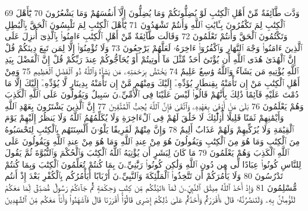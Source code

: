 {\tiny\colorbox{cl_aya}{69}} وَدَّت طَّآئِفَةٌ مِّنْ أَهْلِ ٱلْكِتَٰبِ لَوْ يُضِلُّونَكُمْ وَمَا يُضِلُّونَ إِلَّآ أَنفُسَهُمْ وَمَا يَشْعُرُونَ
{\tiny\colorbox{cl_aya}{70}} يَٰٓأَهْلَ ٱلْكِتَٰبِ لِمَ تَكْفُرُونَ بِـَٔايَٰتِ ٱللَّهِ وَأَنتُمْ تَشْهَدُونَ
{\tiny\colorbox{cl_aya}{71}} يَٰٓأَهْلَ ٱلْكِتَٰبِ لِمَ تَلْبِسُونَ ٱلْحَقَّ بِٱلْبَٰطِلِ وَتَكْتُمُونَ ٱلْحَقَّ وَأَنتُمْ تَعْلَمُونَ
{\tiny\colorbox{cl_aya}{72}} وَقَالَت طَّآئِفَةٌ مِّنْ أَهْلِ ٱلْكِتَٰبِ ءَامِنُوا۟ بِٱلَّذِىٓ أُنزِلَ عَلَى ٱلَّذِينَ ءَامَنُوا۟ وَجْهَ ٱلنَّهَارِ وَٱكْفُرُوٓا۟ ءَاخِرَهُۥ لَعَلَّهُمْ يَرْجِعُونَ
{\tiny\colorbox{cl_aya}{73}} وَلَا تُؤْمِنُوٓا۟ إِلَّا لِمَن تَبِعَ دِينَكُمْ قُلْ إِنَّ ٱلْهُدَىٰ هُدَى ٱللَّهِ أَن يُؤْتَىٰٓ أَحَدٌ مِّثْلَ مَآ أُوتِيتُمْ أَوْ يُحَآجُّوكُمْ عِندَ رَبِّكُمْ قُلْ إِنَّ ٱلْفَضْلَ بِيَدِ ٱللَّهِ يُؤْتِيهِ مَن يَشَآءُ وَٱللَّهُ وَٰسِعٌ عَلِيمٌ
{\tiny\colorbox{cl_aya}{74}} يَخْتَصُّ بِرَحْمَتِهِۦ مَن يَشَآءُ وَٱللَّهُ ذُو ٱلْفَضْلِ ٱلْعَظِيمِ
{\tiny\colorbox{cl_aya}{75}} وَمِنْ أَهْلِ ٱلْكِتَٰبِ مَنْ إِن تَأْمَنْهُ بِقِنطَارٍ يُؤَدِّهِۦٓ إِلَيْكَ وَمِنْهُم مَّنْ إِن تَأْمَنْهُ بِدِينَارٍ لَّا يُؤَدِّهِۦٓ إِلَيْكَ إِلَّا مَا دُمْتَ عَلَيْهِ قَآئِمًا ذَٰلِكَ بِأَنَّهُمْ قَالُوا۟ لَيْسَ عَلَيْنَا فِى ٱلْأُمِّيِّۦنَ سَبِيلٌ وَيَقُولُونَ عَلَى ٱللَّهِ ٱلْكَذِبَ وَهُمْ يَعْلَمُونَ
{\tiny\colorbox{cl_aya}{76}} بَلَىٰ مَنْ أَوْفَىٰ بِعَهْدِهِۦ وَٱتَّقَىٰ فَإِنَّ ٱللَّهَ يُحِبُّ ٱلْمُتَّقِينَ
{\tiny\colorbox{cl_aya}{77}} إِنَّ ٱلَّذِينَ يَشْتَرُونَ بِعَهْدِ ٱللَّهِ وَأَيْمَٰنِهِمْ ثَمَنًا قَلِيلًا أُو۟لَٰٓئِكَ لَا خَلَٰقَ لَهُمْ فِى ٱلْءَاخِرَةِ وَلَا يُكَلِّمُهُمُ ٱللَّهُ وَلَا يَنظُرُ إِلَيْهِمْ يَوْمَ ٱلْقِيَٰمَةِ وَلَا يُزَكِّيهِمْ وَلَهُمْ عَذَابٌ أَلِيمٌ
{\tiny\colorbox{cl_aya}{78}} وَإِنَّ مِنْهُمْ لَفَرِيقًا يَلْوُۥنَ أَلْسِنَتَهُم بِٱلْكِتَٰبِ لِتَحْسَبُوهُ مِنَ ٱلْكِتَٰبِ وَمَا هُوَ مِنَ ٱلْكِتَٰبِ وَيَقُولُونَ هُوَ مِنْ عِندِ ٱللَّهِ وَمَا هُوَ مِنْ عِندِ ٱللَّهِ وَيَقُولُونَ عَلَى ٱللَّهِ ٱلْكَذِبَ وَهُمْ يَعْلَمُونَ
{\tiny\colorbox{cl_aya}{79}} مَا كَانَ لِبَشَرٍ أَن يُؤْتِيَهُ ٱللَّهُ ٱلْكِتَٰبَ وَٱلْحُكْمَ وَٱلنُّبُوَّةَ ثُمَّ يَقُولَ لِلنَّاسِ كُونُوا۟ عِبَادًا لِّى مِن دُونِ ٱللَّهِ وَلَٰكِن كُونُوا۟ رَبَّٰنِيِّۦنَ بِمَا كُنتُمْ تُعَلِّمُونَ ٱلْكِتَٰبَ وَبِمَا كُنتُمْ تَدْرُسُونَ
{\tiny\colorbox{cl_aya}{80}} وَلَا يَأْمُرَكُمْ أَن تَتَّخِذُوا۟ ٱلْمَلَٰٓئِكَةَ وَٱلنَّبِيِّۦنَ أَرْبَابًا أَيَأْمُرُكُم بِٱلْكُفْرِ بَعْدَ إِذْ أَنتُم مُّسْلِمُونَ
{\tiny\colorbox{cl_aya}{81}} وَإِذْ أَخَذَ ٱللَّهُ مِيثَٰقَ ٱلنَّبِيِّۦنَ لَمَآ ءَاتَيْتُكُم مِّن كِتَٰبٍ وَحِكْمَةٍ ثُمَّ جَآءَكُمْ رَسُولٌ مُّصَدِّقٌ لِّمَا مَعَكُمْ لَتُؤْمِنُنَّ بِهِۦ وَلَتَنصُرُنَّهُۥ قَالَ ءَأَقْرَرْتُمْ وَأَخَذْتُمْ عَلَىٰ ذَٰلِكُمْ إِصْرِى قَالُوٓا۟ أَقْرَرْنَا قَالَ فَٱشْهَدُوا۟ وَأَنَا۠ مَعَكُم مِّنَ ٱلشَّٰهِدِينَ
